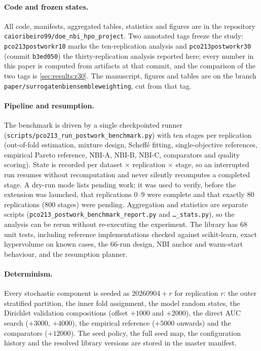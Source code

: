 \label{sec:repro}

\paragraph{Code and frozen states.} All code, manifests, aggregated tables, statistics and figures are in the
repository \texttt{caioribeiro99/doe\_nbi\_hpo\_project}. Two annotated tags freeze the study: \texttt{pco213\-postwork\-r10} marks the ten-replication analysis and \texttt{pco213\-postwork\-r30} (commit \texttt{b3ed050}) the
thirty-replication analysis reported here; every number in this paper is computed from artifacts at that commit, and
the comparison of the two tags is \cref{sec:results:r30}. The manuscript, figures and tables are on the branch \texttt{paper/\allowbreak surrogate\-nbi\-ensemble\-weighting},
cut from that tag.

\paragraph{Pipeline and resumption.} The benchmark is driven by a single checkpointed runner (\texttt{scripts/\allowbreak pco213\_\allowbreak run\_\allowbreak postwork\_\allowbreak benchmark.py}) with ten stages per
replication (out-of-fold estimation, mixture design, Scheff\'e fitting, single-objective references, empirical Pareto
reference, NBI-A, NBI-B, NBI-C, comparators and quality scoring). State is recorded per dataset $\times$ replication
$\times$ stage, so an interrupted run resumes without recomputation and never silently recomputes a completed stage.
A dry-run mode lists pending work; it was used to verify, before the extension was launched, that replications 0--9
were complete and that exactly 80 replications (800 stages) were pending. Aggregation and statistics are separate
scripts (\texttt{pco213\_\allowbreak postwork\_\allowbreak benchmark\_\allowbreak report.py} and \texttt{\ldots\_\allowbreak stats.py}), so the analysis
can be rerun without re-executing the experiment. The library has 68 unit tests, including reference implementations
checked against scikit-learn, exact hypervolume on known cases, the 66-run design, NBI anchor and warm-start
behaviour, and the resumption planner.

\paragraph{Determinism.} Every stochastic component is seeded as $\text{20260904} + r$ for replication $r$: the outer
stratified partition, the inner fold assignment, the model random states, the Dirichlet validation compositions
(offset $+1000$ and $+2000$), the direct AUC search ($+3000$, $+4000$), the empirical reference ($+5000$ onwards) and
the comparators ($+12000$). The seed policy, the full seed map, the configuration history and the resolved library
versions are stored in the master manifest.

